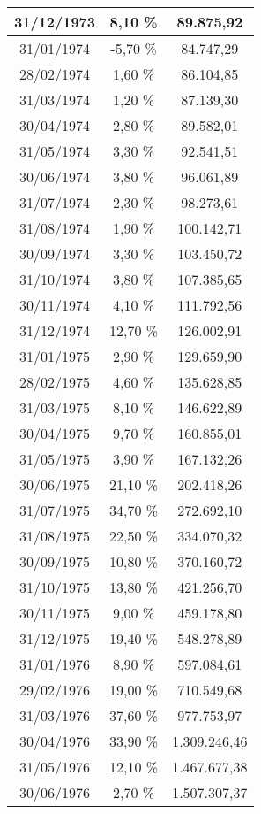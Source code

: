 \begin{center}
\begin{longtable}{|c|c|c|}
31/12/1973 & 8,10 \% & 89.875,92  \\ \hline
31/01/1974 & -5,70 \% & 84.747,29  \\ \hline
28/02/1974 & 1,60 \% & 86.104,85  \\ \hline
31/03/1974 & 1,20 \% & 87.139,30  \\ \hline
30/04/1974 & 2,80 \% & 89.582,01  \\ \hline
31/05/1974 & 3,30 \% & 92.541,51  \\ \hline
30/06/1974 & 3,80 \% & 96.061,89  \\ \hline
31/07/1974 & 2,30 \% & 98.273,61  \\ \hline
31/08/1974 & 1,90 \% & 100.142,71  \\ \hline
30/09/1974 & 3,30 \% & 103.450,72  \\ \hline
31/10/1974 & 3,80 \% & 107.385,65  \\ \hline
30/11/1974 & 4,10 \% & 111.792,56  \\ \hline
31/12/1974 & 12,70 \% & 126.002,91  \\ \hline
31/01/1975 & 2,90 \% & 129.659,90  \\ \hline
28/02/1975 & 4,60 \% & 135.628,85  \\ \hline
31/03/1975 & 8,10 \% & 146.622,89  \\ \hline
30/04/1975 & 9,70 \% & 160.855,01  \\ \hline
31/05/1975 & 3,90 \% & 167.132,26  \\ \hline
30/06/1975 & 21,10 \% & 202.418,26  \\ \hline
31/07/1975 & 34,70 \% & 272.692,10  \\ \hline
31/08/1975 & 22,50 \% & 334.070,32  \\ \hline
30/09/1975 & 10,80 \% & 370.160,72  \\ \hline
31/10/1975 & 13,80 \% & 421.256,70  \\ \hline
30/11/1975 & 9,00 \% & 459.178,80  \\ \hline
31/12/1975 & 19,40 \% & 548.278,89  \\ \hline
31/01/1976 & 8,90 \% & 597.084,61  \\ \hline
29/02/1976 & 19,00 \% & 710.549,68  \\ \hline
31/03/1976 & 37,60 \% & 977.753,97  \\ \hline
30/04/1976 & 33,90 \% & 1.309.246,46  \\ \hline
31/05/1976 & 12,10 \% & 1.467.677,38  \\ \hline
30/06/1976 & 2,70 \% & 1.507.307,37  \\ \hline

\end{longtable}
\end{center}
